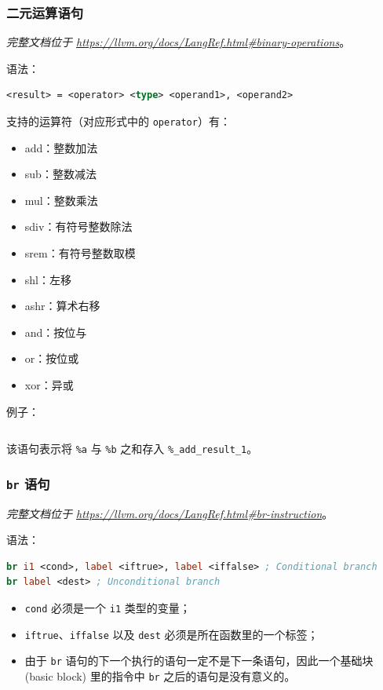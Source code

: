\subsubsection{二元运算语句}\label{LLVM-binary-statements}

\textit{完整文档位于 \url{https://llvm.org/docs/LangRef.html\#binary-operations}}。

语法：
\begin{lstlisting}[language=llvm]
<result> = <operator> <type> <operand1>, <operand2>
\end{lstlisting}

支持的运算符（对应形式中的 \texttt{operator}）有：
\begin{itemize}
  \item add：整数加法
  \item sub：整数减法
  \item mul：整数乘法
  \item sdiv：有符号整数除法
  \item srem：有符号整数取模
  \item shl：左移
  \item ashr：算术右移
  \item and：按位与
  \item or：按位或
  \item xor：异或
\end{itemize}

例子：
\begin{lstlisting}[language=llvm]
%_add_result_1 = add i32 %a, %b
\end{lstlisting}

该语句表示将 \texttt{\%a} 与 \texttt{\%b} 之和存入 \texttt{\%\_add\_result\_1}。

\subsubsection{\texttt{br} 语句}\label{LLVM-br-statements}

\textit{完整文档位于 \url{https://llvm.org/docs/LangRef.html\#br-instruction}}。

语法：
\begin{lstlisting}[language=llvm]
br i1 <cond>, label <iftrue>, label <iffalse> ; Conditional branch
br label <dest> ; Unconditional branch
\end{lstlisting}

\begin{itemize}
  \item \texttt{cond} 必须是一个 \texttt{i1} 类型的变量；
  \item \texttt{iftrue}、\texttt{iffalse} 以及 \texttt{dest}
    必须是所在函数里的一个标签；
  \item 由于 \texttt{br} 语句的下一个执行的语句一定不是下一条语句，因此一个基础块
    (basic block) 里的指令中 \texttt{br} 之后的语句是没有意义的。
\end{itemize}

